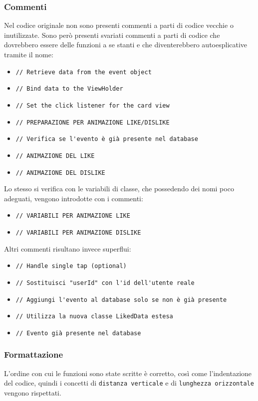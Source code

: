 \subsubsection{Commenti}
Nel codice originale non sono presenti commenti a parti di codice vecchie o inutilizzate. Sono però presenti svariati commenti a parti di codice che dovrebbero essere delle funzioni a se stanti e che diventerebbero autoesplicative tramite il nome:
\begin{itemize}
    \item \verb|// Retrieve data from the event object|
    \item \verb|// Bind data to the ViewHolder|
    \item \verb|// Set the click listener for the card view|
    \item \verb|// PREPARAZIONE PER ANIMAZIONE LIKE/DISLIKE|
    \item \verb|// Verifica se l'evento è già presente nel database|
    \item \verb|// ANIMAZIONE DEL LIKE|
    \item \verb|// ANIMAZIONE DEL DISLIKE|
\end{itemize}
Lo stesso si verifica con le variabili di classe, che possedendo dei nomi poco adeguati, vengono introdotte con i commenti:
\begin{itemize}
    \item \verb|// VARIABILI PER ANIMAZIONE LIKE|
    \item \verb|// VARIABILI PER ANIMAZIONE DISLIKE|
\end{itemize}
Altri commenti risultano invece superflui:
\begin{itemize}
    \item \verb|// Handle single tap (optional)|
    \item \verb|// Sostituisci "userId" con l'id dell'utente reale|
    \item \verb|// Aggiungi l'evento al database solo se non è già presente|
    \item \verb|// Utilizza la nuova classe LikedData estesa|
    \item \verb|// Evento già presente nel database|
\end{itemize}

\subsubsection{Formattazione}
L'ordine con cui le funzioni sono state scritte è corretto, così come l'indentazione del codice, quindi i concetti di \verb|distanza verticale| e di \verb|lunghezza orizzontale| vengono rispettati.
